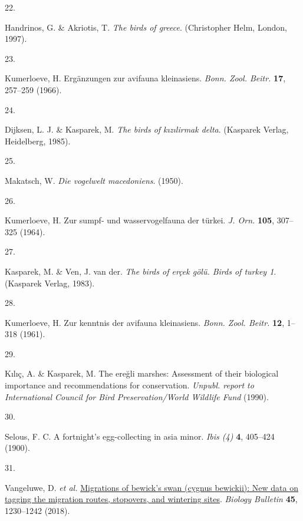 \documentclass[
  letterpaper,
  DIV=11,
  numbers=noendperiod]{scrreprt}
\newlength{\cslhangindent}
\newlength{\csllabelwidth}
\newlength{\cslentryspacingunit} %
\newenvironment{CSLReferences}[2] %
 {%
  \setlength{\parindent}{0pt}
  \ifodd #1
  \let\oldpar\par
  \def\par{\hangindent=\cslhangindent\oldpar}
  \fi
  \setlength{\parskip}{#2\cslentryspacingunit}
 }%
 {}
\newcommand{\CSLLeftMargin}[1]{\parbox[t]{\csllabelwidth}{#1}}
\newcommand{\CSLRightInline}[1]{\parbox[t]{\linewidth - \csllabelwidth}{#1}\break}
\begin{document}
\begin{CSLReferences}{0}{0}
\leavevmode{}%
\CSLLeftMargin{22. }%
\CSLRightInline{Handrinos, G. \& Akriotis, T. \emph{The birds of
greece}. (Christopher Helm, London, 1997).}

\leavevmode{}%
\CSLLeftMargin{23. }%
\CSLRightInline{Kumerloeve, H. Ergänzungen zur avifauna kleinasiens.
\emph{Bonn. Zool. Beitr.} \textbf{17}, 257--259 (1966).}

\leavevmode{}%
\CSLLeftMargin{24. }%
\CSLRightInline{Dijksen, L. J. \& Kasparek, M. \emph{The birds of
kızılirmak delta}. (Kasparek Verlag, Heidelberg, 1985).}

\leavevmode{}%
\CSLLeftMargin{25. }%
\CSLRightInline{Makatsch, W. \emph{Die vogelwelt macedoniens}. (1950).}

\leavevmode{}%
\CSLLeftMargin{26. }%
\CSLRightInline{Kumerloeve, H. Zur sumpf- und wasservogelfauna der
türkei. \emph{J. Orn.} \textbf{105}, 307--325 (1964).}

\leavevmode{}%
\CSLLeftMargin{27. }%
\CSLRightInline{Kasparek, M. \& Ven, J. van der. \emph{The birds of
erçek gölü. Birds of turkey 1}. (Kasparek Verlag, 1983).}

\leavevmode{}%
\CSLLeftMargin{28. }%
\CSLRightInline{Kumerloeve, H. Zur kenntnis der avifauna kleinasiens.
\emph{Bonn. Zool. Beitr.} \textbf{12}, 1--318 (1961).}

\leavevmode{}%
\CSLLeftMargin{29. }%
\CSLRightInline{Kılıç, A. \& Kasparek, M. The ereğli marshes: Assessment
of their biological importance and recommendations for conservation.
\emph{Unpubl. report to International Council for Bird
Preservation/World Wildlife Fund} (1990).}

\leavevmode{}%
\CSLLeftMargin{30. }%
\CSLRightInline{Selous, F. C. A fortnight's egg-collecting in asia
minor. \emph{Ibis (4)} \textbf{4}, 405--424 (1900).}

\leavevmode{}%
\CSLLeftMargin{31. }%
\CSLRightInline{Vangeluwe, D. \emph{et al.}
\href{https://doi.org/10.1134/S1062359018070178}{Migrations of bewick's
swan (cygnus bewickii): New data on tagging the migration routes,
stopovers, and wintering sites}. \emph{Biology Bulletin} \textbf{45},
1230--1242 (2018).}


\end{CSLReferences}
\end{document}
